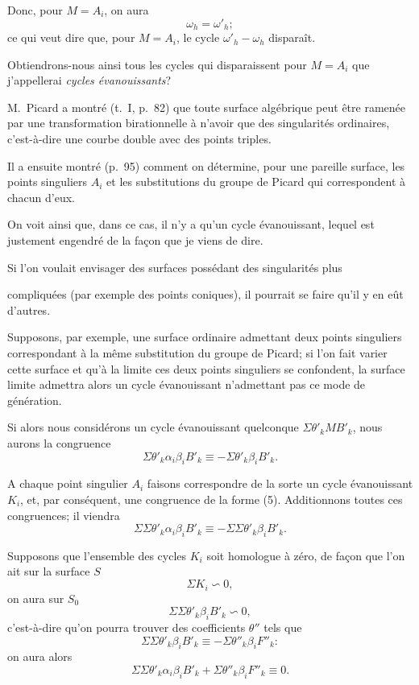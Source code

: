 \documentclass{article}
\begin{document}
Donc, pour $M = A_{i}$, on aura
\[ \omega_{h} = \omega'_{h}; \]
ce qui veut dire que, pour $M = A_{i}$, le cycle $\omega'_{h} - \omega_{h}$ disparaît.

Obtiendrons-nous ainsi tous les cycles qui disparaissent pour $M = A_{i}$ que j'appellerai \emph{cycles évanouissants}?

M.~Picard a montré (t.\ I, p.\ 82) que toute surface algébrique peut être ramenée par une transformation birationnelle à n'avoir que des singularités ordinaires, c'est-à-dire une courbe double avec des points triples.

Il a ensuite montré (p.\ 95) comment on détermine, pour une pareille surface, les points singuliers $A_{i}$ et les substitutions du groupe de Picard qui correspondent à chacun d'eux.

On voit ainsi que, dans ce cas, il n'y a qu'un cycle évanouissant, lequel est justement engendré de la façon que je viens de dire.

Si l'on voulait envisager des surfaces possédant des singularités plus

compliquées (par exemple des points coniques), il pourrait se faire qu'il y en eût d'autres.

Supposons, par exemple, une surface ordinaire admettant deux points singuliers correspondant à la même substitution du groupe de Picard; si l'on fait varier cette surface et qu'à la limite ces deux points singuliers se confondent, la surface limite admettra alors un cycle évanouissant n'admettant pas ce mode de génération.

Si alors nous considérons un cycle évanouissant quelconque $\Sigma \theta'_{k} MB'_{k}$, nous aurons la congruence
\[ \Sigma \theta'_{k} \alpha_{i}\beta_{i}B'_{k} \equiv -\Sigma \theta'_{k} \beta_{i}B'_{k}. \tag{5} \]

A chaque point singulier $A_{i}$ faisons correspondre de la sorte un cycle évanouissant $K_{i}$, et, par conséquent, une congruence de la forme (5). Additionnons toutes ces congruences; il viendra
\[ \Sigma \Sigma \theta'_{k} \alpha_{i}\beta_{i}B'_{k} \equiv -\Sigma \Sigma \theta'_{k} \beta_{i}B'_{k}. \]

Supposons que l'ensemble des cycles $K_{i}$ soit homologue à zéro, de façon que l'on ait sur la surface $S$
\[ \Sigma K_{i} \backsim 0, \]
on aura sur $S_{0}$
\[ \Sigma \Sigma \theta'_{k} \beta_{i}B'_{k} \backsim 0, \]
c'est-à-dire qu'on pourra trouver des coefficients $\theta''$ tels que
\[ \Sigma \Sigma \theta'_{k} \beta_{i}B'_{k} \equiv -\Sigma \theta''_{k} \beta_{i}F''_{k}: \]
on aura alors
\[ \Sigma \Sigma \theta'_{k} \alpha_{i}\beta_{i}B'_{k} + \Sigma \theta''_{k} \beta_{i}F''_{k} \equiv 0. \tag{2} \]
\end{document}
